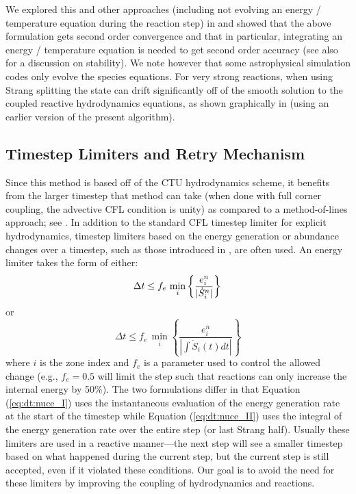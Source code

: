 \documentclass[linenumbers]{aastex631}
\newcommand{\MarginPar}[1]{\marginpar{\vskip-\baselineskip\raggedright\tiny\sffamily\hrule\smallskip{\color{red}#1}\par\smallskip\hrule}}
\begin{document}
We explored this and other approaches (including not evolving an
energy / temperature equation during the reaction step) in
\citet{strang_rnaas} and showed that the above formulation gets second
order convergence and that in particular, integrating an energy / temperature
equation is needed to get second order accuracy (see also
\citealt{muller:1986} for a discussion on stability).  We note however
that some astrophysical simulation codes only evolve the species
equations.  For very strong reactions, when using Strang splitting the
state can drift significantly off of the smooth solution to the
coupled reactive hydrodynamics equations, as shown graphically in
\citet{astronum:2018} (using an earlier version of the present
algorithm).  


\subsection{Timestep Limiters and Retry Mechanism}

Since this method is based off of the CTU hydrodynamics scheme, it
benefits from the larger timestep that method can take (when done with
full corner coupling, the advective CFL condition is unity) as
compared to a method-of-lines approach; see \cite{ppmunsplit}.  In
addition to the standard CFL timestep limiter for explicit
hydrodynamics, timestep limiters based on
the energy generation or abundance changes over a timestep, such as
those introduced in \cite{prometheus}, are often used.  An energy limiter takes the
form of either:
\begin{equation}
\label{eq:dt:nuce_I}
\Delta t \le f_e\, \min_{i} \left\{\frac{e^n_{i}}{|\dot{S}_{i}^n|}\right\} \\
\end{equation}
or
\begin{equation}
\label{eq:dt:nuce_II}
\Delta t \le f_e\, \min_{i} \left\{ \frac{e^n_i}{|\int \dot{S}_i(t) dt|} \right\}
\end{equation}
where $i$ is the zone index and $f_e$ is a parameter used to control
the allowed change (e.g., $f_e = 0.5$ will limit the step such that
reactions can only increase the internal energy by 50\%).  The two
formulations differ in that Equation (\ref{eq:dt:nuce_I}) uses the
instantaneous evaluation of the energy generation rate at the start of
the timestep while Equation (\ref{eq:dt:nuce_II}) uses the integral of the
energy generation rate over the entire step (or last Strang half).
Usually these limiters are used in a reactive manner---the next step will see
a smaller timestep based on what happened during the current step, but the
current step is still accepted, even if it violated these conditions.  Our
goal is to avoid the need for these limiters by improving the coupling of hydrodynamics
and reactions.
\end{document}
